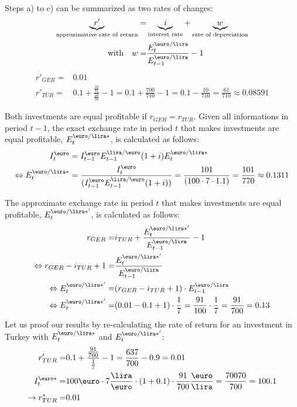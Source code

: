 {{		\\
		Steps a) to c) can be summarized as two rates of changes:
		\begin{align*}
			\underbrace{r'}_{\textnormal{approximative rate of return}}=&\underbrace{i}_{\textnormal{interest rate}}+\underbrace{w}_{\textnormal{rate of depreciation}}\\
			\textnormal{with}\quad	w=&\frac{E^{\euro/\lira}_{t}}{E^{\euro/\lira}_{t-1}}-1
		\end{align*}
		\begin{align*}
			r'_{GER}=&0.01\\
			r'_{TUR}=&0.1+\frac{\frac{10}{71}}{\frac{10}{70}}-1=0.1+\frac{700}{710}-1=0.1-\frac{10}{710}=\frac{61}{710}\approx 0.08591
		\end{align*}
		
		\item Both investments are equal profitable if $r_{GER}=r_{TUR}$. Given all informations in period $t-1$, the exact exchange rate in period $t$ that makes investments are equal profitable, $E^{\euro/\lira*}_{t}$, is calculated as follows:
		\begin{align*} 
			I^{\euro}_{t}&=I^{\euro}_{t-1} E^{\lira/\euro}_{t-1} (1+i) E^{\euro/\lira *}_{t}\\
			\Leftrightarrow E^{\euro/\lira*}_{t}&= \frac{I^{\euro}_{t}}{(I^{\euro}_{t-1} E^{\lira/\euro}_{t-1} (1+i))}=\frac{101}{(100\cdot 7 \cdot 1.1)}=\frac{101}{770}\approx 0.1311
		\end{align*}
		
		The approximate exchange rate in period $t$ that makes investments are equal profitable, $E^{\euro/\lira*'}_{t}$, is calculated as follows:
		\begin{align*}
			r_{GER}=&i_{TUR}+\frac{E^{\euro/\lira*'}_{t}}{E^{\euro/\lira}_{t-1}}-1\\
			\Leftrightarrow r_{GER}-i_{TUR}+1=&\frac{E^{\euro/\lira*'}_{t}}{E^{\euro/\lira}_{t-1}}\\
			\Leftrightarrow E^{\euro/\lira*'}_{t}=& (r_{GER}-i_{TUR}+1)\cdot E^{\euro/\lira}_{t-1}\\
			\Leftrightarrow E^{\euro/\lira*'}_{t}=& (0.01-0.1+1)\cdot \frac{1}{7}=\frac{91}{100}\cdot \frac{1}{7}=\frac{91}{700}=0.13
		\end{align*}
		Let us proof our results by re-calculating the rate of return for an investment in Turkey with  $E^{\euro/\lira*}_{t}$ and $E^{\euro/\lira*'}_{t}$:
		\begin{align*}
			r'_{TUR}=&0.1+\frac{\frac{91}{700}}{\frac{1}{7}}-1=\frac{637}{700}-0.9=0.01\\
			I_{t}^{\euro*}=&100\euro\cdot 7\frac{\lira}{\euro}\cdot (1+0.1)\cdot \frac{91}{700}\frac{\euro}{\lira}= \frac{70070}{700}=100.1\\
			\rightarrow r_{TUR}^*=&0.01
		\end{align*} 
		
}}

